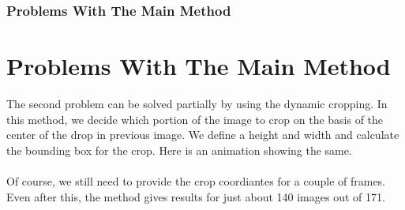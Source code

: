 \documentclass{beamer}
\begin{document}
\begin{frame}
    \frametitle{Problems With The Main Method}
    \section{Problems With The Main Method}
    \small
    The second problem can be solved partially by using the dynamic cropping. In this method, we decide which portion of the image to crop on the basis of the center of the drop in previous image. We define a height and width and calculate the bounding box for the crop. Here is an animation showing the same.\\
    \centering
    \\
    \small
    Of course, we still need to provide the crop coordiantes for a couple of frames. Even after this, the method gives results for just about 140 images out of 171.
\end{frame}
\end{document}
